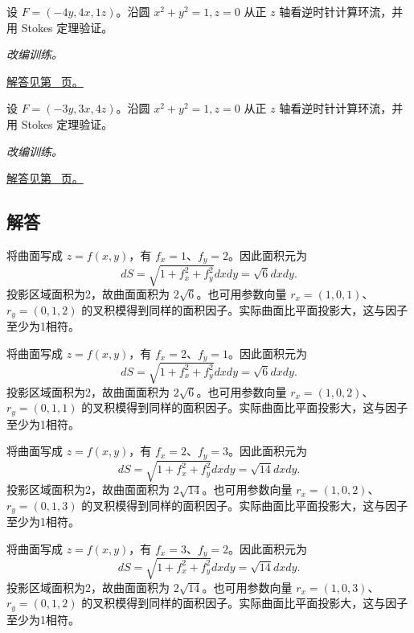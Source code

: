 \documentclass[12pt,fontset=fandol]{ctexart}
\begin{document}
\begin{example}\label{ex:c43q23}
设 $F=(-4y,4x,1z)$。沿圆 $x^2+y^2=1,z=0$ 从正 $z$ 轴看逆时针计算环流，并用 Stokes 定理验证。
\par\textit{改编训练。}\par\hyperref[ans:c43q23]{解答见第~\pageref{ans:c43q23} 页。}
\end{example}
\begin{example}\label{ex:c43q24}
设 $F=(-3y,3x,4z)$。沿圆 $x^2+y^2=1,z=0$ 从正 $z$ 轴看逆时针计算环流，并用 Stokes 定理验证。
\par\textit{改编训练。}\par\hyperref[ans:c43q24]{解答见第~\pageref{ans:c43q24} 页。}
\end{example}
\subsection{解答}
\begin{solve}\label{ans:c43q1}
将曲面写成 $z=f(x,y)$，有 $f_x=1$、$f_y=2$。因此面积元为
\[
dS=\sqrt{1+f_x^2+f_y^2}dxdy=\sqrt{6}dxdy.
\]
投影区域面积为2，故曲面面积为 $2\sqrt{6}$。也可用参数向量 $r_x=(1,0,1)$、$r_y=(0,1,2)$ 的叉积模得到同样的面积因子。实际曲面比平面投影大，这与因子至少为1相符。
\end{solve}

\begin{solve}\label{ans:c43q2}
将曲面写成 $z=f(x,y)$，有 $f_x=2$、$f_y=1$。因此面积元为
\[
dS=\sqrt{1+f_x^2+f_y^2}dxdy=\sqrt{6}dxdy.
\]
投影区域面积为2，故曲面面积为 $2\sqrt{6}$。也可用参数向量 $r_x=(1,0,2)$、$r_y=(0,1,1)$ 的叉积模得到同样的面积因子。实际曲面比平面投影大，这与因子至少为1相符。
\end{solve}

\begin{solve}\label{ans:c43q3}
将曲面写成 $z=f(x,y)$，有 $f_x=2$、$f_y=3$。因此面积元为
\[
dS=\sqrt{1+f_x^2+f_y^2}dxdy=\sqrt{14}dxdy.
\]
投影区域面积为2，故曲面面积为 $2\sqrt{14}$。也可用参数向量 $r_x=(1,0,2)$、$r_y=(0,1,3)$ 的叉积模得到同样的面积因子。实际曲面比平面投影大，这与因子至少为1相符。
\end{solve}

\begin{solve}\label{ans:c43q4}
将曲面写成 $z=f(x,y)$，有 $f_x=3$、$f_y=2$。因此面积元为
\[
dS=\sqrt{1+f_x^2+f_y^2}dxdy=\sqrt{14}dxdy.
\]
投影区域面积为2，故曲面面积为 $2\sqrt{14}$。也可用参数向量 $r_x=(1,0,3)$、$r_y=(0,1,2)$ 的叉积模得到同样的面积因子。实际曲面比平面投影大，这与因子至少为1相符。
\end{solve}
\end{document}
